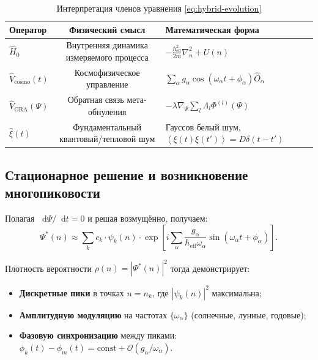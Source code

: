 \documentclass[12pt,a4paper]{article}
\theoremstyle{plain}
\theoremstyle{definition}
\theoremstyle{remark}
\newcommand{\GRA}{\text{GRA}}
\newcommand{\eff}{\text{eff}}
\newcommand{\cosmo}{\text{cosmo}}
\newcommand{\abs}[1]{\left|#1\right|}
\newcommand{\expect}[1]{\left\langle #1 \right\rangle}
\newcommand{\diff}{\mathop{}\!\mathrm{d}}
\begin{document}
\begin{table}[H]
\centering
\caption{Интерпретация членов уравнения \eqref{eq:hybrid-evolution}}
\label{tab:operator-dictionary}
\renewcommand{\arraystretch}{1.4}
\begin{tabular}{@{}lcp{8cm}@{}}
\toprule
\textbf{Оператор} & \textbf{Физический смысл} & \textbf{Математическая форма} \\
\midrule
$\hat{H}_0$ & Внутренняя динамика измеряемого процесса & $-\frac{\hbar_{\eff}^2}{2m}\nabla_n^2 + U(n)$ \\
\addlinespace
$\hat{V}_{\cosmo}(t)$ & Космофизическое управление & $\sum_{\alpha} g_{\alpha} \cos(\omega_{\alpha} t + \phi_{\alpha}) \hat{O}_{\alpha}$ \\
\addlinespace
$\hat{V}_{\GRA}(\Psi)$ & Обратная связь мета-обнуления & $-\lambda \nabla_{\Psi} \sum_l \Lambda_l \Phi^{(l)}(\Psi)$ \\
\addlinespace
$\hat{\xi}(t)$ & Фундаментальный квантовый/тепловой шум & Гауссов белый шум, $\expect{\xi(t)\xi(t')} = D\delta(t-t')$ \\
\bottomrule
\end{tabular}
\end{table}

\subsection{Стационарное решение и возникновение многопиковости}

Полагая $\diff\Psi/\diff t = 0$ и решая возмущённо, получаем:
\begin{equation}
\Psi^*(n) \approx \sum_k c_k \cdot \psi_k(n) \cdot 
\exp\left[i \sum_{\alpha} \frac{g_{\alpha}}{\hbar_{\eff}\omega_{\alpha}} \sin(\omega_{\alpha} t + \phi_{\alpha})\right].
\label{eq:stationary-solution}
\end{equation}

Плотность вероятности $\rho(n) = \abs{\Psi^*(n)}^2$ тогда демонстрирует:
\begin{itemize}
    \item \textbf{Дискретные пики} в точках $n = n_k$, где $\abs{\psi_k(n)}^2$ максимальна;
    \item \textbf{Амплитудную модуляцию} на частотах $\{\omega_{\alpha}\}$ (солнечные, лунные, годовые);
    \item \textbf{Фазовую синхронизацию} между пиками: $\phi_k(t) - \phi_m(t) = \text{const} + \mathcal{O}(g_{\alpha}/\omega_{\alpha})$.
\end{itemize}
\end{document}
